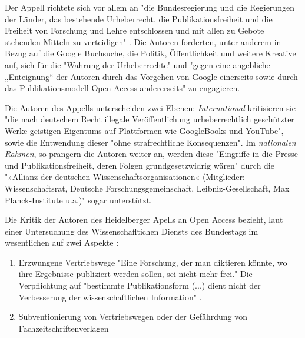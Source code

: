 Der Appell richtete sich vor allem an "die Bundesregierung und die Regierungen der Länder, das bestehende Urheberrecht, die Publikationsfreiheit und die Freiheit von Forschung und Lehre entschlossen und mit allen zu Gebote stehenden Mitteln zu verteidigen" \cite{ITK_2009}. Die Autoren forderten, unter anderem in Bezug auf die Google Buchsuche, die Politik, Öffentlichkeit und weitere Kreative auf, sich für die "Wahrung der Urheberrechte" und "gegen eine angebliche „Enteignung“ der Autoren durch das Vorgehen von Google einerseits sowie durch das Publikationsmodell Open Access andererseits" \cite{WD_bundestag_2009} zu engagieren. 

Die Autoren des Appells unterscheiden zwei Ebenen: \textit{International} kritisieren sie "die nach deutschem Recht illegale Veröffentlichung urheberrechtlich geschützter Werke geistigen Eigentums auf Plattformen wie GoogleBooks und YouTube", sowie die Entwendung dieser "ohne strafrechtliche Konsequenzen". Im \textit{nationalen Rahmen}, so prangern die Autoren weiter an, werden diese "Eingriffe in die Presse- und Publikationsfreiheit, deren Folgen grundgesetzwidrig wären" durch die "»Allianz der deutschen Wissenschaftsorganisationen« (Mitglieder: Wissenschaftsrat, Deutsche Forschungsgemeinschaft, Leibniz-Gesellschaft, Max Planck-Institute u.a.)" sogar unterstützt.\cite{ITK_2009}

Die Kritik der Autoren des Heidelberger Apells an Open Access bezieht, laut einer Untersuchung des Wissenschafltichen Diensts des Bundestags im wesentlichen auf zwei Aspekte \cite{WD_bundestag_2009}:
\begin{enumerate}
\item Erzwungene Vertriebswege
"Eine Forschung, der man diktieren könnte, wo ihre Ergebnisse publiziert werden sollen, sei nicht mehr frei." Die Verpflichtung auf "bestimmte Publikationsform (...) dient nicht der Verbesserung der wissenschaftlichen Information" \cite{ITK_2009}.
\item Subventionierung von Vertriebswegen oder der Gefährdung von Fachzeitschriftenverlagen
\end{enumerate}

